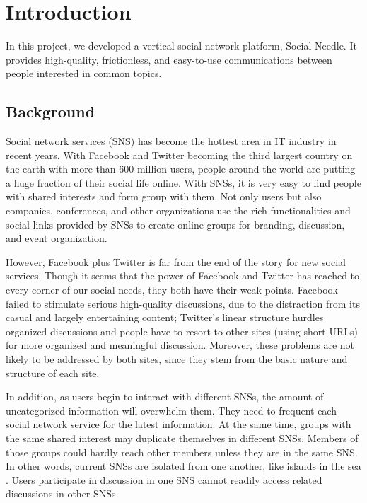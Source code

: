 
%
%

\chapter{Introduction}
In this project, we developed a vertical social network platform, Social Needle. It provides high-quality, frictionless, and easy-to-use communications between people interested in common topics. 

\section{Background}
Social network services (SNS) has become the hottest area in IT industry in recent years. With Facebook and Twitter becoming the third largest country on the earth with more than 600 million users, people around the world are putting a huge fraction of their social life online. With SNSs, it is very easy to find people with shared interests and form group with them. Not only users but also companies, conferences, and other organizations use the rich functionalities and social links provided by SNSs to create online groups for branding, discussion, and event organization.

However, Facebook plus Twitter is far from the end of the story for new social services. Though it seems that the power of Facebook and Twitter has reached to every corner of our social needs, they both have their weak points. Facebook failed to stimulate serious high-quality discussions, due to the distraction from its casual and largely entertaining content; Twitter's linear structure hurdles organized discussions and people have to resort to other sites (using short URLs) for more organized and meaningful discussion. Moreover, these problems are not likely to be addressed by both sites, since they stem from the basic nature and structure of each site.

In addition, as users begin to interact with different SNSs, the amount of uncategorized information will overwhelm them. They need to frequent each social network service for the latest information. At the same time, groups with the same shared interest may duplicate themselves in different SNSs. Members of those groups could hardly reach other members unless they are in the same SNS. In other words, current SNSs are isolated from one another, like islands in the sea \cite{10.1109/MIS.2008.50}. Users participate in discussion in one SNS cannot readily
access related discussions in other SNSs.

